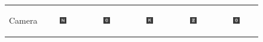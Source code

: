 
\begin{figure}[!t]
	\centering
	
	\begin{tabular}{@{}r@{ } c@{ } c@{ } c@{ } c@{ } c }

	\begin{sideways} \parbox[b]{20mm} {Camera} \end{sideways} &
	\includegraphics[width=0.185\textwidth]{__Images/05/BW_20-200_+2@180/bw_N_20-200_Camera+2,00D@180(lens).png} &
	\includegraphics[width=0.185\textwidth]{__Images/05/BW_20-200_+2@180/bw_C_20-200_Camera+2,00D@180(lens).png} &
	\includegraphics[width=0.185\textwidth]{__Images/05/BW_20-200_+2@180/bw_K_20-200_Camera+2,00D@180(lens).png} &
	\includegraphics[width=0.185\textwidth]{__Images/05/BW_20-200_+2@180/bw_Z_20-200_Camera+2,00D@180(lens).png} &
	\includegraphics[width=0.185\textwidth]{__Images/05/BW_20-200_+2@180/bw_O_20-200_Camera+2,00D@180(lens).png} \\


\end{tabular}
\end{figure}
